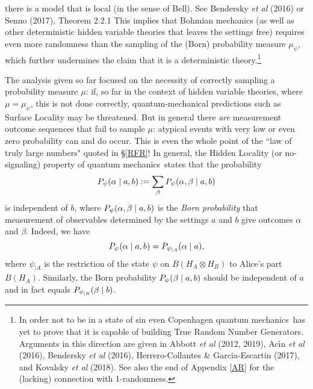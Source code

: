 \documentclass[11pt,a4paper]{article}
\numberwithin{equation}{section}
\newcommand{\qm}{quantum mechanics}
\newcommand{\ot}{\otimes}
\newcommand{\al}{\alpha} \newcommand{\bt}{L\beta}
\begin{document}
there is a model that is local (in the sense of Bell).
 See  Bendersky \emph{et al} (2016) or Senno (2017), Theorem 2.2.1
This  implies that Bohmian mechanics (as well as  other deterministic hidden variable theories that leaves the settings free) requires even more randomness than the sampling of the (Born) probability measure $\mu_{\psi}$, which further undermines the claim that it is a  deterministic theory.\footnote{\label{fnqrng} In order not to be in a state of sin even Copenhagen \qm\ has yet to prove that it is capable of building True Random Number Generators. Arguments in this direction are given in Abbott \emph{et al} (2012, 2019),  
 Ac\'{\i}n  \emph{et al} (2016), Bendersky  \emph{et al} (2016), Herrero-Collantes \& Garcia-Escartin (2017), and Kovalsky \emph{et al} (2018). See also the end of Appendix \ref{AR} for the (lacking) connection with 1-randomness.}
 
  The analysis given so far focused on the necessity of correctly sampling a probability measure $\mu$: if, so far in the context of hidden variable theories, where $\mu=\mu_{\psi}$, this is not done correctly, quantum-mechanical predictions such as Surface Locality may be threatened. But in general there \emph{are} measurement outcome sequences that fail to sample $\mu$:  atypical events with very low  or even zero probability can and do occur. This is even the whole point of the ``law of truly large numbers" quoted in \S\ref{RFR}!
 In general, the Hidden Locality (or no-signaling) property of \qm\ states that the probability
\begin{equation}
P_{\ps}(\al\mid a,b):= \sum_\beta P_{\ps}(\al, \beta\mid a, b) \label{NS}
\end{equation}
is independent of $b$, where $P_{\ps}(\al, \beta\mid a, b)$
is the \emph{Born probability} that measurement of observables determined by the settings $a$ and $b$ give outcomes $\al$ and $\beta$. Indeed, we have
\begin{equation}
P_{\ps}(\al\mid a,b)=P_{\ps_{|A}}(\al\mid a),
\end{equation}
where $\psi_{|A}$ is the restriction of the state $\psi$ on $B(H_A\ot H_B)$ to Alice's part $B(H_A)$. Similarly, the Born probability
$P_{\psi}(\beta\mid a,b)$ should be independent of $a$ and in fact equals $P_{\psi_{|B}}(\beta\mid b)$.
\end{document}

